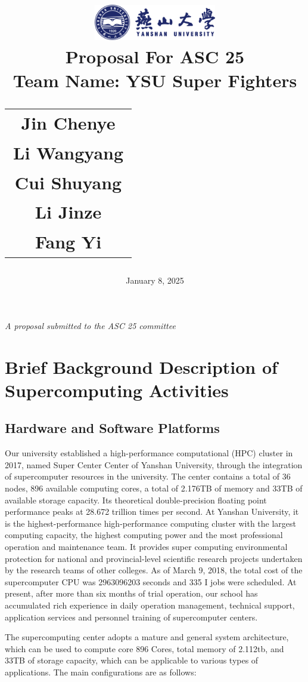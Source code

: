 \documentclass[a4paper,12pt]{article}
\title{
    \includegraphics[width=0.4\textwidth]{ysu-logo.png}\\[1cm] %
    {\LARGE Proposal For ASC 25}\\[0.5cm]
    \large Team Name: YSU Super Fighters\\[1cm] %
    \begin{tabular}{c}
        \large Jin Chenye \\
        \large Li Wangyang \\
        \large Cui Shuyang \\
        \large Li Jinze \\
        \large Fang Yi
    \end{tabular}
}
\author{}
\date{\vfill January 8, 2025}
\begin{document}
\maketitle
\thispagestyle{empty}
\vfill
\begin{center}
    \textit{A proposal submitted to the ASC 25 committee}
\end{center}
\newpage

\tableofcontents
{}
\newpage

\section{Brief Background Description of Supercomputing Activities}

\subsection{Hardware and Software Platforms}
Our university established a high-performance computational (HPC) cluster in 2017, named Super Center Center of Yanshan University, through the integration of supercomputer resources in the university. The center contains a total of 36 nodes, 896 available computing cores, a total of 2.176TB of memory and 33TB of available storage capacity. Its theoretical double-precision floating point performance peaks at 28.672 trillion times per second. At Yanshan University, it is the highest-performance high-performance computing cluster with the largest computing capacity, the highest computing power and the most professional operation and maintenance team. It provides super computing environmental protection for national and provincial-level scientific research projects undertaken by the research teams of other colleges. As of March 9, 2018, the total cost of the supercomputer CPU was 2963096203 seconds and 335 I jobs were scheduled. At present, after more than six months of trial operation, our school has accumulated rich experience in daily operation management, technical support, application services and personnel training of supercomputer centers.

The supercomputing center adopts a mature and general system architecture, which can be used to compute core 896 Cores, total memory of 2.112tb, and 33TB of storage capacity, which can be applicable to various types of applications. The main configurations are as follows:
\end{document}
